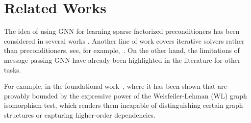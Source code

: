 \section{Related Works}
The idea of using GNN for learning sparse factorized preconditioners has been considered in several works 
\cite{hausner2023neural,trifonov2024learning,li2023learning,li2024generative,chen2024graph,booth2024neural}.
Another line of work covers iterative solvers rather than preconditioners, see, for example,~\cite{luoneural}.
On the other hand, the limitations of message-passing GNN have already been highlighted in the literature for other tasks.

For example, in the foundational work~\cite{xu2018powerful}, where it has been shown
that are provably bounded by the expressive power of the Weisfeiler-Lehman (WL) graph isomorphism test, 
which renders them incapable of distinguishing 
certain graph structures or capturing higher-order dependencies.